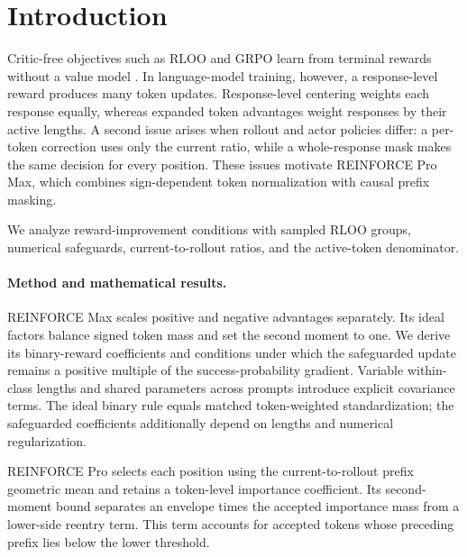 \section{Introduction}
Critic-free objectives such as RLOO and GRPO learn from terminal rewards
without a value model \citep{ahmadian2024back,shao2024deepseekmath}.
In language-model training, however, a response-level reward produces many
token updates. Response-level centering weights each response equally, whereas
expanded token advantages weight responses by their active lengths. A second issue
arises when rollout and actor policies differ: a per-token correction uses
only the current ratio, while a whole-response mask makes the same
decision for every position. These issues motivate REINFORCE Pro Max,
which combines sign-dependent token normalization with causal prefix masking.

We analyze reward-improvement conditions with sampled RLOO groups,
numerical safeguards, current-to-rollout ratios, and the active-token denominator.

\paragraph{Method and mathematical results.}
REINFORCE Max scales positive and negative advantages separately.
Its ideal factors balance signed token mass and set the second moment to one. We derive its binary-reward
coefficients and conditions under which the safeguarded update remains a
positive multiple of the success-probability gradient. Variable within-class
lengths and shared parameters across prompts introduce explicit covariance
terms. The ideal binary rule equals matched token-weighted standardization;
the safeguarded coefficients additionally depend on lengths and numerical
regularization.

REINFORCE Pro selects each position using the current-to-rollout prefix geometric mean
and retains a token-level importance coefficient. Its second-moment bound
separates an envelope times the accepted importance mass from a lower-side
reentry term. This term accounts for accepted tokens whose preceding prefix lies
below the lower threshold.

